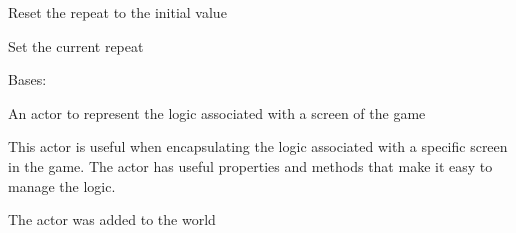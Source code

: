 \documentclass[letterpaper,10pt,english]{sphinxmanual}
\begin{document}
\begin{fulllineitems}
\begin{fulllineitems}
\end{fulllineitems}


\begin{fulllineitems}
\label{blocks:serge.blocks.actors.RepeatedVisualActor.resetRepeat}
Reset the repeat to the initial value

\end{fulllineitems}


\begin{fulllineitems}
\label{blocks:serge.blocks.actors.RepeatedVisualActor.setRepeat}
Set the current repeat

\end{fulllineitems}


\end{fulllineitems}


\begin{fulllineitems}
\label{blocks:serge.blocks.actors.ScreenActor}
Bases: {\hyperref[actor:serge.actor.CompositeActor]{}}

An actor to represent the logic associated with a screen of the game

This actor is useful when encapsulating the logic associated with a specific
screen in the game. The actor has useful properties and methods that
make it easy to manage the logic.

\begin{fulllineitems}
\label{blocks:serge.blocks.actors.ScreenActor.addedToWorld}
The actor was added to the world

\end{fulllineitems}


\end{fulllineitems}

\end{document}
